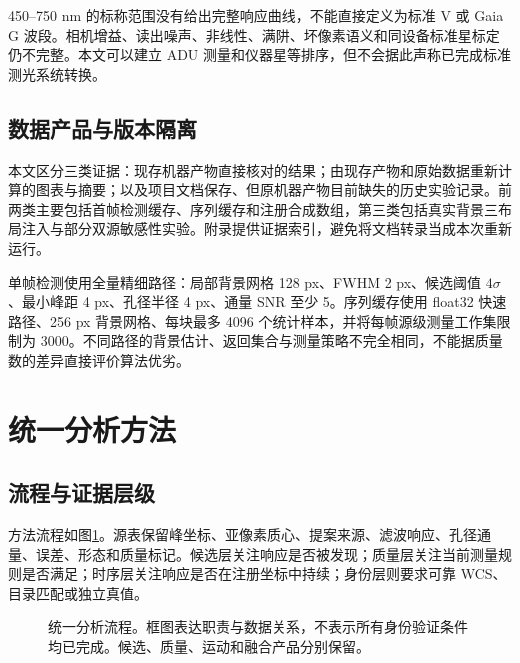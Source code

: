 \documentclass[UTF8,a4paper,11pt,fontset=windows]{ctexart}
\begin{document}
450--750 nm 的标称范围没有给出完整响应曲线，不能直接定义为标准 V 或 Gaia G 波段。相机增益、读出噪声、非线性、满阱、坏像素语义和同设备标准星标定仍不完整。本文可以建立 ADU 测量和仪器星等排序，但不会据此声称已完成标准测光系统转换。

\subsection{数据产品与版本隔离}
本文区分三类证据：现存机器产物直接核对的结果；由现存产物和原始数据重新计算的图表与摘要；以及项目文档保存、但原机器产物目前缺失的历史实验记录。前两类主要包括首帧检测缓存、序列缓存和注册合成数组，第三类包括真实背景三布局注入与部分双源敏感性实验。附录提供证据索引，避免将文档转录当成本次重新运行。

单帧检测使用全量精细路径：局部背景网格 128 px、FWHM 2 px、候选阈值 $4\sigma$、最小峰距 4 px、孔径半径 4 px、通量 SNR 至少 5。序列缓存使用 float32 快速路径、256 px 背景网格、每块最多 4096 个统计样本，并将每帧源级测量工作集限制为 3000。不同路径的背景估计、返回集合与测量策略不完全相同，不能据质量数的差异直接评价算法优劣。

\section{统一分析方法}\label{sec:method}
\subsection{流程与证据层级}
方法流程如图\ref{fig:flow}。源表保留峰坐标、亚像素质心、提案来源、滤波响应、孔径通量、误差、形态和质量标记。候选层关注响应是否被发现；质量层关注当前测量规则是否满足；时序层关注响应是否在注册坐标中持续；身份层则要求可靠 WCS、目录匹配或独立真值。

\begin{figure}[!htbp]\centering
{}
\caption{统一分析流程。框图表达职责与数据关系，不表示所有身份验证条件均已完成。候选、质量、运动和融合产品分别保留。}\label{fig:flow}
\end{figure}
\end{document}
